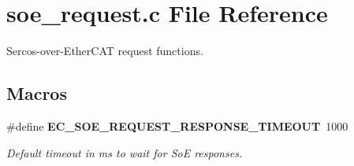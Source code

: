 \section{soe\-\_\-request.\-c File Reference}
\label{soe__request_8c}


Sercos-\/over-\/\-Ether\-C\-A\-T request functions.  


\subsection*{Macros}
\begin{DoxyCompactItemize}
\item 
\#define {\bf E\-C\-\_\-\-S\-O\-E\-\_\-\-R\-E\-Q\-U\-E\-S\-T\-\_\-\-R\-E\-S\-P\-O\-N\-S\-E\-\_\-\-T\-I\-M\-E\-O\-U\-T}~1000\label{soe__request_8c_a4a6708f336ebb21896abbd6b9c272ec2}

\begin{DoxyCompactList}\small\item\em Default timeout in ms to wait for So\-E responses. \end{DoxyCompactList}\end{DoxyCompactItemize}
